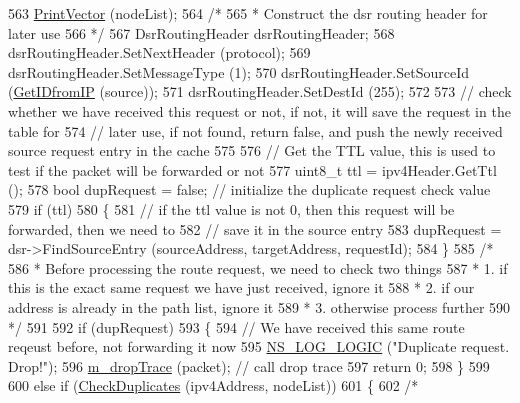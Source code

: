 \begin{DoxyCode}
563   \hyperlink{classns3_1_1dsr_1_1DsrOptions_a44ae8e58769880ec9c0150bb28652350}{PrintVector} (nodeList);
564   \textcolor{comment}{/*}
565 \textcolor{comment}{   * Construct the dsr routing header for later use}
566 \textcolor{comment}{   */}
567   DsrRoutingHeader dsrRoutingHeader;
568   dsrRoutingHeader.SetNextHeader (protocol);
569   dsrRoutingHeader.SetMessageType (1);
570   dsrRoutingHeader.SetSourceId (\hyperlink{classns3_1_1dsr_1_1DsrOptions_a7e53a9a0421c607e17866e7dd0dd5440}{GetIDfromIP} (source));
571   dsrRoutingHeader.SetDestId (255);
572 
573   \textcolor{comment}{// check whether we have received this request or not, if not, it will save the request in the table for}
574   \textcolor{comment}{// later use, if not found, return false, and push the newly received source request entry in the cache}
575 
576   \textcolor{comment}{// Get the TTL value, this is used to test if the packet will be forwarded or not}
577   uint8\_t ttl = ipv4Header.GetTtl ();
578   \textcolor{keywordtype}{bool} dupRequest = \textcolor{keyword}{false};  \textcolor{comment}{// initialize the duplicate request check value}
579   \textcolor{keywordflow}{if} (ttl)
580     \{
581       \textcolor{comment}{// if the ttl value is not 0, then this request will be forwarded, then we need to}
582       \textcolor{comment}{// save it in the source entry}
583       dupRequest = dsr->FindSourceEntry (sourceAddress, targetAddress, requestId);
584     \}
585   \textcolor{comment}{/*}
586 \textcolor{comment}{   * Before processing the route request, we need to check two things}
587 \textcolor{comment}{   * 1. if this is the exact same request we have just received, ignore it}
588 \textcolor{comment}{   * 2. if our address is already in the path list, ignore it}
589 \textcolor{comment}{   * 3. otherwise process further}
590 \textcolor{comment}{   */}
591 
592   \textcolor{keywordflow}{if} (dupRequest)
593     \{
594       \textcolor{comment}{// We have received this same route reqeust before, not forwarding it now}
595       \hyperlink{group__logging_ga88acd260151caf2db9c0fc84997f45ce}{NS\_LOG\_LOGIC} (\textcolor{stringliteral}{"Duplicate request. Drop!"});
596       \hyperlink{classns3_1_1dsr_1_1DsrOptions_a176bbc9efb58b6d750c14b9b03c525c4}{m\_dropTrace} (packet); \textcolor{comment}{// call drop trace}
597       \textcolor{keywordflow}{return} 0;
598     \}
599 
600   \textcolor{keywordflow}{else} \textcolor{keywordflow}{if} (\hyperlink{classns3_1_1dsr_1_1DsrOptions_a2d973cc79c1a784317f3b03a834a831e}{CheckDuplicates} (ipv4Address, nodeList))
601     \{
602       \textcolor{comment}{/*}

\end{DoxyCode}
